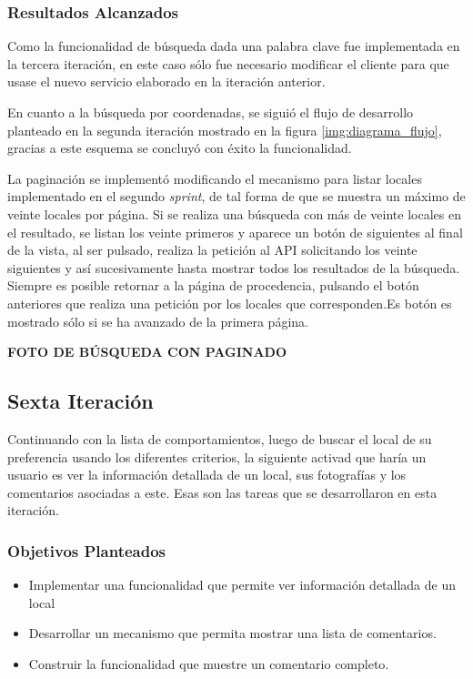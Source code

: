 \subsubsection{Resultados Alcanzados}

Como la funcionalidad de búsqueda dada una palabra clave fue implementada en la tercera iteración, en este caso sólo fue necesario modificar el cliente para que usase el nuevo servicio elaborado en la iteración anterior.

En cuanto a la búsqueda por coordenadas, se siguió el flujo de desarrollo planteado en la segunda iteración mostrado en la figura \ref{img:diagrama_flujo}, gracias a este esquema se concluyó con éxito la funcionalidad.

La paginación se implementó modificando el mecanismo para listar locales implementado en el segundo \textit{sprint}, de tal forma de que se muestra un máximo de veinte locales por página. Si se realiza una búsqueda con más de veinte locales en el resultado, se listan los veinte primeros y aparece un botón de siguientes al final de la vista, al ser pulsado, realiza la petición al API solicitando los veinte siguientes y así sucesivamente hasta mostrar todos los resultados de la búsqueda. Siempre es posible retornar a la página de procedencia, pulsando el botón anteriores que realiza una petición por los locales que corresponden.Es botón es mostrado sólo si se ha avanzado de la primera página.



 
\textbf{FOTO DE BÚSQUEDA CON PAGINADO}


\subsection{Sexta Iteración}
Continuando con la lista de comportamientos, luego de buscar el local de su preferencia usando los diferentes criterios, la siguiente activad que haría un usuario es ver la información detallada de un local, sus fotografías y los comentarios asociadas a este. Esas son las tareas que se desarrollaron en esta iteración. 
\subsubsection{Objetivos Planteados} 

\begin{itemize}
\item Implementar una funcionalidad que permite ver información detallada de un local
\item Desarrollar un mecanismo que permita mostrar una lista de comentarios.
\item Construir la funcionalidad que muestre un comentario completo.
\end{itemize}

